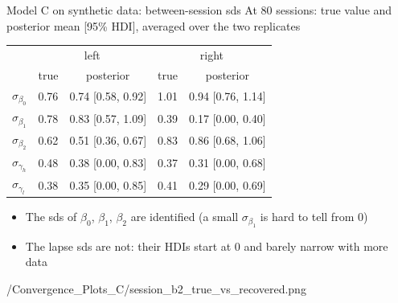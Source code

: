 \begin{frame}{Model C on synthetic data: between-session sds}
  At 80 sessions: true value and posterior mean [95\% HDI], averaged over the two replicates
  \vspace{0.5em}

  \centering\small
  \begin{tabular}{lcccc}
    \toprule
     & \multicolumn{2}{c}{left} & \multicolumn{2}{c}{right} \\
     & true & posterior & true & posterior \\
    \midrule
    $\sigma_{\beta_0}$  & 0.76 & 0.74 [0.58, 0.92] & 1.01 & 0.94 [0.76, 1.14] \\
    $\sigma_{\beta_1}$  & 0.78 & 0.83 [0.57, 1.09] & 0.39 & 0.17 [0.00, 0.40] \\
    $\sigma_{\beta_2}$  & 0.62 & 0.51 [0.36, 0.67] & 0.83 & 0.86 [0.68, 1.06] \\
    $\sigma_{\gamma_h}$ & 0.48 & 0.38 [0.00, 0.83] & 0.37 & 0.31 [0.00, 0.68] \\
    $\sigma_{\gamma_l}$ & 0.38 & 0.35 [0.00, 0.85] & 0.41 & 0.29 [0.00, 0.69] \\
    \bottomrule
  \end{tabular}

  \vspace{0.5em}
  \raggedright
  \begin{itemize}
    \item The sds of $\beta_0$, $\beta_1$, $\beta_2$ are identified (a small $\sigma_{\beta_1}$ is
          hard to tell from 0)
    \item The lapse sds are not: their HDIs start at 0 and barely narrow with more data
  \end{itemize}
\end{frame}

  {\plotsC/Convergence_Plots_C/session_b2_true_vs_recovered.png}

